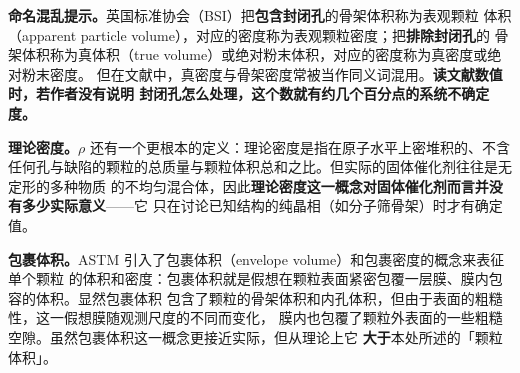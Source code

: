 \begin{principle}
\textbf{命名混乱提示。}英国标准协会（BSI）把\textbf{包含封闭孔}的骨架体积称为表观颗粒
体积（apparent particle volume），对应的密度称为表观颗粒密度；把\textbf{排除封闭孔}的
骨架体积称为真体积（true volume）或绝对粉末体积，对应的密度称为真密度或绝对粉末密度。
但在文献中，真密度与骨架密度常被当作同义词混用。\textbf{读文献数值时，若作者没有说明
封闭孔怎么处理，这个数就有约几个百分点的系统不确定度。}

\textbf{理论密度。}$\rho$ 还有一个更根本的定义：理论密度是指在原子水平上密堆积的、不含
任何孔与缺陷的颗粒的总质量与颗粒体积总和之比。但实际的固体催化剂往往是无定形的多种物质
的不均匀混合体，因此\textbf{理论密度这一概念对固体催化剂而言并没有多少实际意义}——它
只在讨论已知结构的纯晶相（如分子筛骨架）时才有确定值。

\textbf{包裹体积。}ASTM 引入了包裹体积（envelope volume）和包裹密度的概念来表征单个颗粒
的体积和密度：包裹体积就是假想在颗粒表面紧密包覆一层膜、膜内包容的体积。显然包裹体积
包含了颗粒的骨架体积和内孔体积，但由于表面的粗糙性，这一假想膜随观测尺度的不同而变化，
膜内也包覆了颗粒外表面的一些粗糙空隙。虽然包裹体积这一概念更接近实际，但从理论上它
\textbf{大于}本处所述的「颗粒体积」。
\end{principle}

